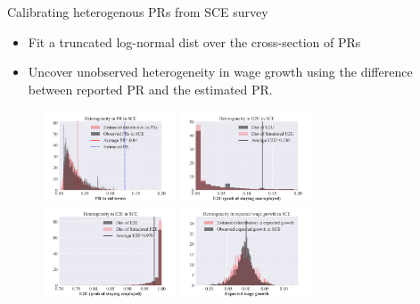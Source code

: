 \documentclass{beamer}
\begin{document}
\begin{frame}{Calibrating heterogenous PRs from SCE survey}
	\label{calibration_survey_risks}
	
	\begin{itemize}
		\item Fit a truncated log-normal dist over the cross-section of PRs 
		\item Uncover unobserved heterogeneity in wage growth using the difference between reported PR and the estimated PR. 
	\end{itemize}
	
	\begin{figure}
		\centering
		\label{fig:calibration_survey}
		\includegraphics[width=0.35\textwidth]{figures/log_normal_pr_fit.pdf} 
		\pause
		\includegraphics[width=0.35\textwidth]{figures/log_normal_u2u_fit.pdf} 
		\\
		\includegraphics[width=0.35\textwidth]{figures/log_normal_e2e_fit.pdf} 
		\pause
		\includegraphics[width=0.35\textwidth]{figures/log_normal_exp_fit.pdf} 
	\end{figure}
	
\end{frame}
\end{document}

